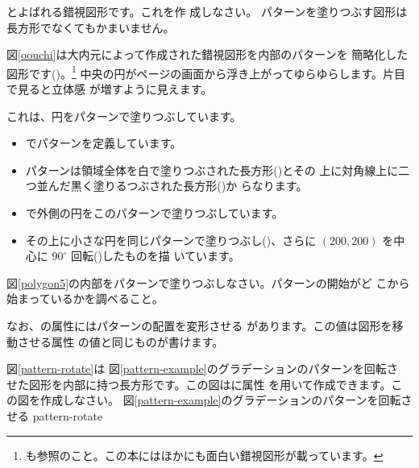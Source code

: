 {とよばれる錯視図形です。これを作
成しなさい。}
パターンを塗りつぶす図形は長方形でなくてもかまいません。

図\ref{oouchi}は大内元によって作成された錯視図形を内部のパターンを
簡略化した図形です(\cite[74ページ図7.5]{Ninio})。\footnote{\cite[75ペー
ジ]{Ouchi}も参照のこと。この本にはほかにも面白い錯視図形が載っています。}
中央の円がページの画面から浮き上がってゆらゆらします。片目で見ると立体感
が増すように見えます。

これは、円をパターンで塗りつぶしています。
{}
\begin{itemize}
 \item {}でパターンを定義しています。
 \item パターンは領域全体を白で塗りつぶされた長方形()とその
       上に対角線上に二つ並んだ黒く塗りるつぶされた長方形()か
       らなります。
 \item {}で外側の円をこのパターンで塗りつぶしています。
 \item その上に小さな円を同じパターンで塗りつぶし()、さらに
       $(200,200)$ を中心に $90^{\circ}$ 回転()したものを描
       いています。
\end{itemize}
\begin{Problem}\upshape
 図\ref{polygon5}の内部をパターンで塗りつぶしなさい。パターンの開始がど
 こから始まっているかを調べること。
\end{Problem}
なお、の属性にはパターンの配置を変形させる
があります。この値は図形を移動させる属性
の値と同じものが書けます。
\begin{Problem}\upshape\label{prob-pattern-rotate}
    図\ref{pattern-rotate}は
図\ref{pattern-example}のグラデーションのパターンを回転さ
せた図形を内部に持つ長方形です。この図はに属性
 を用いて作成できます。この図を作成しなさい。
{図\ref{pattern-example}のグラデーションのパターンを回転させる}
{pattern-rotate} %
\end{Problem}
